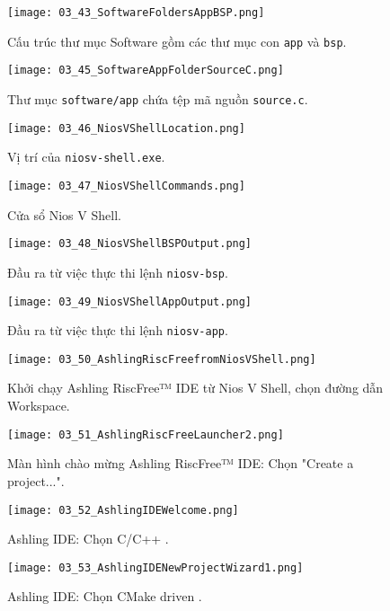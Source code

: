 \begin{figure}[htbp] \centering \texttt{[image: 03\_43\_SoftwareFoldersAppBSP.png]} \caption{Cấu trúc thư mục Software gồm các thư mục con \texttt{app} và \texttt{bsp}.} \label{fig:03_43} \end{figure}
\begin{figure}[htbp] \centering \texttt{[image: 03\_45\_SoftwareAppFolderSourceC.png]} \caption{Thư mục \texttt{software/app} chứa tệp mã nguồn \texttt{source.c}.} \label{fig:03_45} \end{figure}
\begin{figure}[htbp] \centering \texttt{[image: 03\_46\_NiosVShellLocation.png]} \caption{Vị trí của \texttt{niosv-shell.exe}.} \label{fig:03_46} \end{figure}
\begin{figure}[htbp] \centering \texttt{[image: 03\_47\_NiosVShellCommands.png]} \caption{Cửa sổ Nios V Shell.} \label{fig:03_47} \end{figure}
\begin{figure}[htbp] \centering \texttt{[image: 03\_48\_NiosVShellBSPOutput.png]} \caption{Đầu ra từ việc thực thi lệnh \texttt{niosv-bsp}.} \label{fig:03_48} \end{figure}\begin{figure}[htbp] \centering \texttt{[image: 03\_49\_NiosVShellAppOutput.png]} \caption{Đầu ra từ việc thực thi lệnh \texttt{niosv-app}.} \label{fig:03_49} \end{figure}
\begin{figure}[htbp] \centering \texttt{[image: 03\_50\_AshlingRiscFreefromNiosVShell.png]} \caption{Khởi chạy Ashling RiscFree™ IDE từ Nios V Shell, chọn đường dẫn Workspace.} \label{fig:03_50} \end{figure}
\begin{figure}[htbp] \centering \texttt{[image: 03\_51\_AshlingRiscFreeLauncher2.png]} \caption{Màn hình chào mừng Ashling RiscFree™ IDE: Chọn "Create a project...".} \label{fig:03_51} \end{figure}
\begin{figure}[htbp] \centering \texttt{[image: 03\_52\_AshlingIDEWelcome.png]} \caption{Ashling IDE: Chọn C/C++ \protect\longrightarrow {}.} \label{fig:03_52} \end{figure}
\begin{figure}[htbp] \centering \texttt{[image: 03\_53\_AshlingIDENewProjectWizard1.png]} \caption{Ashling IDE: Chọn CMake driven \longrightarrow {}.} \label{fig:03_53} \end{figure}
